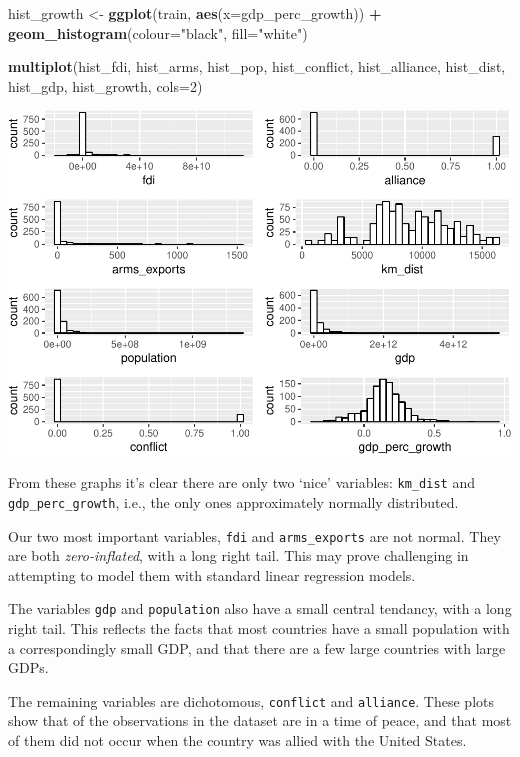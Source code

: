 \documentclass[11pt,]{article}
\newenvironment{Shaded}{\begin{snugshade}}{\end{snugshade}}
\newcommand{\DataTypeTok}[1]{\textcolor[rgb]{0.13,0.29,0.53}{#1}}
\newcommand{\DecValTok}[1]{\textcolor[rgb]{0.00,0.00,0.81}{#1}}
\newcommand{\KeywordTok}[1]{\textcolor[rgb]{0.13,0.29,0.53}{\textbf{#1}}}
\newcommand{\NormalTok}[1]{#1}
\newcommand{\OperatorTok}[1]{\textcolor[rgb]{0.81,0.36,0.00}{\textbf{#1}}}
\newcommand{\StringTok}[1]{\textcolor[rgb]{0.31,0.60,0.02}{#1}}
\begin{document}
\begin{Shaded}
\begin{Highlighting}[]
\NormalTok{hist_growth <-}\StringTok{ }\KeywordTok{ggplot}\NormalTok{(train, }\KeywordTok{aes}\NormalTok{(}\DataTypeTok{x=}\NormalTok{gdp_perc_growth)) }\OperatorTok{+}\StringTok{ }
\StringTok{    }\KeywordTok{geom_histogram}\NormalTok{(}\DataTypeTok{colour=}\StringTok{"black"}\NormalTok{, }\DataTypeTok{fill=}\StringTok{"white"}\NormalTok{)}

\KeywordTok{multiplot}\NormalTok{(hist_fdi, hist_arms, hist_pop, hist_conflict, }
\NormalTok{          hist_alliance, hist_dist, hist_gdp, hist_growth, }\DataTypeTok{cols=}\DecValTok{2}\NormalTok{)}
\end{Highlighting}
\end{Shaded}

\includegraphics{report_files/figure-latex/unnamed-chunk-9-1.pdf}

From these graphs it's clear there are only two `nice' variables:
\texttt{km\_dist} and \texttt{gdp\_perc\_growth}, i.e., the only ones
approximately normally distributed.

Our two most important variables, \texttt{fdi} and
\texttt{arms\_exports} are not normal. They are both
\emph{zero-inflated}, with a long right tail. This may prove challenging
in attempting to model them with standard linear regression models.

The variables \texttt{gdp} and \texttt{population} also have a small
central tendancy, with a long right tail. This reflects the facts that
most countries have a small population with a correspondingly small GDP,
and that there are a few large countries with large GDPs.

The remaining variables are dichotomous, \texttt{conflict} and
\texttt{alliance}. These plots show that of the observations in the
dataset are in a time of peace, and that most of them did not occur when
the country was allied with the United States.
\end{document}
